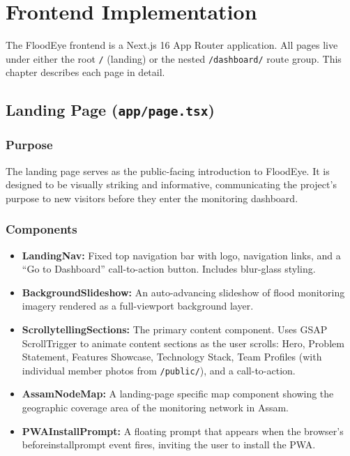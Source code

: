 ﻿%
\chapter{Frontend Implementation}

The FloodEye frontend is a Next.js 16 App Router application. All pages live under either the root \texttt{/\allowbreak{}} (landing) or the nested \texttt{/\allowbreak{}dashboard/\allowbreak{}} route group. This chapter describes each page in detail.

\section{Landing Page (\texttt{app/\allowbreak{}page.\allowbreak{}tsx})}

\subsection{Purpose}
The landing page serves as the public-facing introduction to FloodEye. It is designed to be visually striking and informative, communicating the project's purpose to new visitors before they enter the monitoring dashboard.

\subsection{Components}
\begin{itemize}[leftmargin=1.5em]
  \item \textbf{LandingNav:} Fixed top navigation bar with logo, navigation links, and a ``Go to Dashboard'' call-to-action button. Includes blur-glass styling.
  \item \textbf{BackgroundSlideshow:} An auto-advancing slideshow of flood monitoring imagery rendered as a full-viewport background layer.
  \item \textbf{ScrollytellingSections:} The primary content component. Uses GSAP ScrollTrigger to animate content sections as the user scrolls: Hero, Problem Statement, Features Showcase, Technology Stack, Team Profiles (with individual member photos from \texttt{/\allowbreak{}public/\allowbreak{}}), and a call-to-action.
  \item \textbf{AssamNodeMap:} A landing-page specific map component showing the geographic coverage area of the monitoring network in Assam.
  \item \textbf{PWAInstallPrompt:} A floating prompt that appears when the browser's beforeinstallprompt event fires, inviting the user to install the PWA.
\end{itemize}

